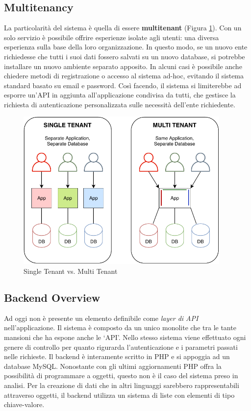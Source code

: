 \subsection{Multitenancy}
La particolarità del sistema è quella di essere \textbf{multitenant} (Figura \ref{fig:multitenancy}). Con un solo servizio è possibile offrire esperienze isolate agli utenti: una diversa esperienza sulla base della loro organizzazione. In questo modo, se un nuovo ente richiedesse che tutti i suoi dati fossero salvati su un nuovo database, si potrebbe installare un nuovo ambiente separato apposito. In alcuni casi è possibile anche chiedere metodi di registrazione o accesso al sistema ad-hoc, evitando il sistema standard basato su email e password. Così facendo, il sistema si limiterebbe ad esporre un'API in aggiunta all'applicazione condivisa da tutti, che gestisce la richiesta di autenticazione personalizzata sulle necessità dell'ente richiedente.
\begin{figure}[H]
    \centering
    \includegraphics[width=0.94\textwidth]{images/02_2_multitenancy.pdf}
    \caption{Single Tenant vs. Multi Tenant}
    \label{fig:multitenancy}
\end{figure}

\subsection{Backend Overview}
Ad oggi non è presente un elemento definibile come \emph{layer di API} nell’applicazione. Il sistema è composto da un unico monolite che tra le tante mansioni che ha espone anche le `API'. Nello stesso sistema viene effettuato ogni genere di controllo per quanto rigurarda l'autenticazione e i parametri passati nelle richieste. Il backend è interamente scritto in PHP e si appoggia ad un database MySQL. Nonostante con gli ultimi aggiornamenti PHP offra la possibilità di programmare a oggetti, questo non è il caso del sistema preso in analisi. Per la creazione di dati che in altri linguaggi sarebbero rappresentabili attraverso oggetti, il backend utilizza un sistema di liste con elementi di tipo chiave-valore.

